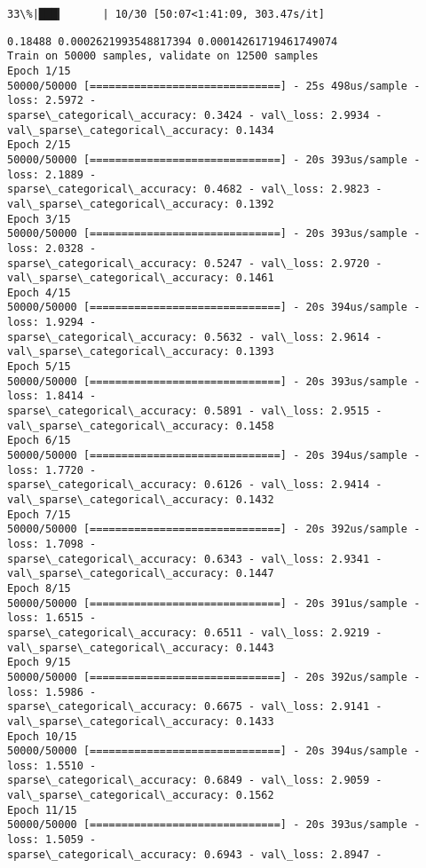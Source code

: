 \documentclass[11pt]{article}
\begin{document}
    \begin{Verbatim}[commandchars=\\\{\}]
 33\%|███▎      | 10/30 [50:07<1:41:09, 303.47s/it]
    \end{Verbatim}

    \begin{Verbatim}[commandchars=\\\{\}]
0.18488 0.0002621993548817394 0.00014261719461749074
Train on 50000 samples, validate on 12500 samples
Epoch 1/15
50000/50000 [==============================] - 25s 498us/sample - loss: 2.5972 -
sparse\_categorical\_accuracy: 0.3424 - val\_loss: 2.9934 -
val\_sparse\_categorical\_accuracy: 0.1434
Epoch 2/15
50000/50000 [==============================] - 20s 393us/sample - loss: 2.1889 -
sparse\_categorical\_accuracy: 0.4682 - val\_loss: 2.9823 -
val\_sparse\_categorical\_accuracy: 0.1392
Epoch 3/15
50000/50000 [==============================] - 20s 393us/sample - loss: 2.0328 -
sparse\_categorical\_accuracy: 0.5247 - val\_loss: 2.9720 -
val\_sparse\_categorical\_accuracy: 0.1461
Epoch 4/15
50000/50000 [==============================] - 20s 394us/sample - loss: 1.9294 -
sparse\_categorical\_accuracy: 0.5632 - val\_loss: 2.9614 -
val\_sparse\_categorical\_accuracy: 0.1393
Epoch 5/15
50000/50000 [==============================] - 20s 393us/sample - loss: 1.8414 -
sparse\_categorical\_accuracy: 0.5891 - val\_loss: 2.9515 -
val\_sparse\_categorical\_accuracy: 0.1458
Epoch 6/15
50000/50000 [==============================] - 20s 394us/sample - loss: 1.7720 -
sparse\_categorical\_accuracy: 0.6126 - val\_loss: 2.9414 -
val\_sparse\_categorical\_accuracy: 0.1432
Epoch 7/15
50000/50000 [==============================] - 20s 392us/sample - loss: 1.7098 -
sparse\_categorical\_accuracy: 0.6343 - val\_loss: 2.9341 -
val\_sparse\_categorical\_accuracy: 0.1447
Epoch 8/15
50000/50000 [==============================] - 20s 391us/sample - loss: 1.6515 -
sparse\_categorical\_accuracy: 0.6511 - val\_loss: 2.9219 -
val\_sparse\_categorical\_accuracy: 0.1443
Epoch 9/15
50000/50000 [==============================] - 20s 392us/sample - loss: 1.5986 -
sparse\_categorical\_accuracy: 0.6675 - val\_loss: 2.9141 -
val\_sparse\_categorical\_accuracy: 0.1433
Epoch 10/15
50000/50000 [==============================] - 20s 394us/sample - loss: 1.5510 -
sparse\_categorical\_accuracy: 0.6849 - val\_loss: 2.9059 -
val\_sparse\_categorical\_accuracy: 0.1562
Epoch 11/15
50000/50000 [==============================] - 20s 393us/sample - loss: 1.5059 -
sparse\_categorical\_accuracy: 0.6943 - val\_loss: 2.8947 -

\end{Verbatim}
\end{document}

